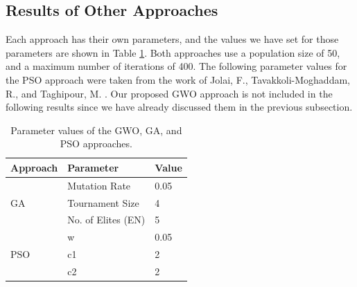 \subsection{Results of Other Approaches}
Each approach has their own parameters, and the values we have set for those parameters are shown in Table \ref{approach-parameters}. Both approaches use a population size of 50, and a maximum number of iterations of 400. The following parameter values for the PSO approach were taken from the work of Jolai, F., Tavakkoli-Moghaddam, R., and Taghipour, M. \cite{Jolai2012}. Our proposed GWO approach is not included in the following results since we have already discussed them in the previous subsection.



\begin{table}[h!]
	\centering
	\begin{tabular}{|l|l|l|}
		\hline
		\textbf{Approach}   & \textbf{Parameter} & \textbf{Value} \\ \hline
		\multirow{3}{*}{GA} & Mutation Rate      & 0.05           \\ \cline{2-3} 
		& Tournament Size    & 4              \\ \cline{2-3} 
		& No. of Elites (EN) & 5              \\ \hline
		\multirow{3}{*}{PSO} & w      & 0.05           \\ \cline{2-3} 
		& c1    & 2              \\ \cline{2-3} 
		& c2 	& 2              \\ \hline
	\end{tabular}
	\caption{Parameter values of the GWO, GA, and PSO approaches.}
	\label{approach-parameters}
\end{table}


